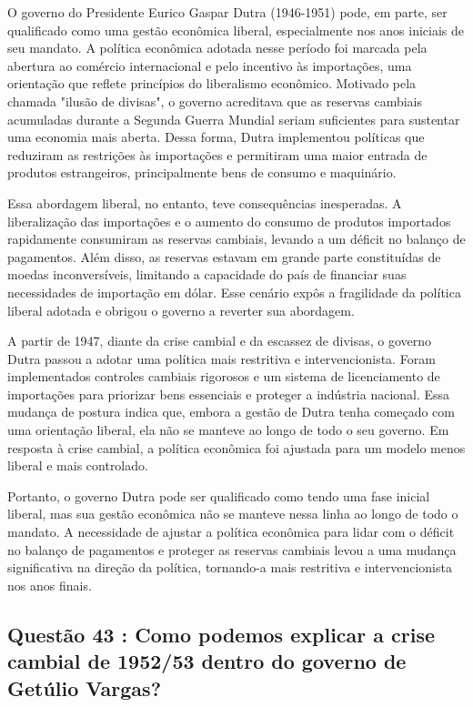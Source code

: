 \documentclass[a4paper,12pt]{article}[abntex2]
\begin{document}
O governo do Presidente Eurico Gaspar Dutra (1946-1951) pode, em parte, ser qualificado como uma gestão econômica liberal, especialmente nos anos iniciais de seu mandato. A política econômica adotada nesse período foi marcada pela abertura ao comércio internacional e pelo incentivo às importações, uma orientação que reflete princípios do liberalismo econômico. Motivado pela chamada "ilusão de divisas", o governo acreditava que as reservas cambiais acumuladas durante a Segunda Guerra Mundial seriam suficientes para sustentar uma economia mais aberta. Dessa forma, Dutra implementou políticas que reduziram as restrições às importações e permitiram uma maior entrada de produtos estrangeiros, principalmente bens de consumo e maquinário.

Essa abordagem liberal, no entanto, teve consequências inesperadas. A liberalização das importações e o aumento do consumo de produtos importados rapidamente consumiram as reservas cambiais, levando a um déficit no balanço de pagamentos. Além disso, as reservas estavam em grande parte constituídas de moedas inconversíveis, limitando a capacidade do país de financiar suas necessidades de importação em dólar. Esse cenário expôs a fragilidade da política liberal adotada e obrigou o governo a reverter sua abordagem.

A partir de 1947, diante da crise cambial e da escassez de divisas, o governo Dutra passou a adotar uma política mais restritiva e intervencionista. Foram implementados controles cambiais rigorosos e um sistema de licenciamento de importações para priorizar bens essenciais e proteger a indústria nacional. Essa mudança de postura indica que, embora a gestão de Dutra tenha começado com uma orientação liberal, ela não se manteve ao longo de todo o seu governo. Em resposta à crise cambial, a política econômica foi ajustada para um modelo menos liberal e mais controlado.

Portanto, o governo Dutra pode ser qualificado como tendo uma fase inicial liberal, mas sua gestão econômica não se manteve nessa linha ao longo de todo o mandato. A necessidade de ajustar a política econômica para lidar com o déficit no balanço de pagamentos e proteger as reservas cambiais levou a uma mudança significativa na direção da política, tornando-a mais restritiva e intervencionista nos anos finais.

\subsection{\textbf{Questão 43 : Como podemos explicar a crise cambial de 1952/53 dentro do governo de Getúlio Vargas?}}
\end{document}
